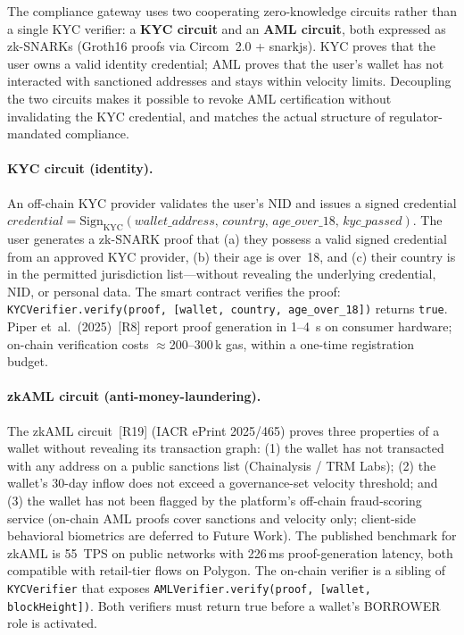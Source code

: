 \documentclass[12pt,a4paper]{report}
\begin{document}
The compliance gateway uses two cooperating zero-knowledge circuits rather than a single KYC verifier: a \textbf{KYC circuit} and an \textbf{AML circuit}, both expressed as zk-SNARKs (Groth16 proofs via Circom~2.0 + snarkjs). KYC proves that the user owns a valid identity credential; AML proves that the user's wallet has not interacted with sanctioned addresses and stays within velocity limits. Decoupling the two circuits makes it possible to revoke AML certification without invalidating the KYC credential, and matches the actual structure of regulator-mandated compliance.

\paragraph{KYC circuit (identity).}
An off-chain KYC provider validates the user's NID and issues a signed credential
\(\textit{credential} = \text{Sign}_{\text{KYC}}(\textit{wallet\_address},\, \textit{country},\, \textit{age\_over\_18},\, \textit{kyc\_passed})\).
The user generates a zk-SNARK proof that (a) they possess a valid signed credential from an approved KYC provider, (b) their age is over~18, and (c) their country is in the permitted jurisdiction list---without revealing the underlying credential, NID, or personal data. The smart contract verifies the proof:
\texttt{KYCVerifier.verify(proof, [wallet, country, age\_over\_18])} returns \texttt{true}.
Piper et~al.~(2025)~[R8] report proof generation in 1--4~s on consumer hardware; on-chain verification costs $\approx$200--300\,k gas, within a one-time registration budget.

\paragraph{zkAML circuit (anti-money-laundering).}
The zkAML circuit~[R19] (IACR ePrint 2025/465) proves three properties of a wallet without revealing its transaction graph: (1) the wallet has not transacted with any address on a public sanctions list (Chainalysis / TRM Labs); (2) the wallet's 30-day inflow does not exceed a governance-set velocity threshold; and (3) the wallet has not been flagged by the platform's off-chain fraud-scoring service (on-chain AML proofs cover sanctions and velocity only; client-side behavioral biometrics are deferred to Future Work). The published benchmark for zkAML is 55~TPS on public networks with 226\,ms proof-generation latency, both compatible with retail-tier flows on Polygon. The on-chain verifier is a sibling of \texttt{KYCVerifier} that exposes \texttt{AMLVerifier.verify(proof, [wallet, blockHeight])}. Both verifiers must return true before a wallet's BORROWER role is activated.
\end{document}
